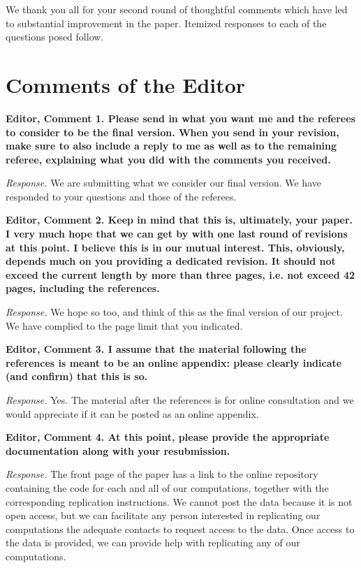 \restoregeometry
\doublespacing

\noindent We thank you all for your second round of thoughtful comments which have led to substantial improvement in the paper. Itemized responses to each of the questions posed follow.

\section*{Comments of the Editor}

\noindent \textbf{Editor, Comment 1. Please send in what you want me and the referees to consider to be the final version. When you send in your revision, make sure to also include a reply to me as well as to the remaining referee, explaining what you did with the comments you received.} 

\noindent \textit{Response.} We are submitting what we consider our final version. We have responded to your questions and those of the referees. 

\noindent \textbf{Editor, Comment 2. Keep in mind that this is, ultimately, your paper. I very much hope that we can get by with one last round of revisions at this point. I believe this is in our mutual interest. This, obviously, depends much on you providing a dedicated revision. It should not exceed the current length by more than three pages, i.e. not exceed 42 pages, including the references.}

\noindent \textit{Response.} We hope so too, and think of this as the final version of our project. We have complied to the page limit that you indicated.

\noindent \textbf{Editor, Comment 3. I assume that the material following the references is meant to be an online appendix: please clearly indicate (and confirm) that this is so.}

\noindent \textit{Response.} Yes. The material after the references is for online consultation and we would appreciate if it can be posted as an online appendix.

\noindent \textbf{Editor, Comment 4. At this point, please provide the appropriate documentation along with your resubmission.}

\noindent \textit{Response.} The front page of the paper has a link to the online repository containing the code for each and all of our computations, together with the corresponding replication instructions. We cannot post the data because it is not open access, but we can facilitate any person interested in replicating our computations the adequate contacts to request access to the data. Once access to the data is provided, we can provide help with replicating any of our computations.


